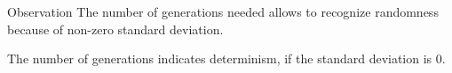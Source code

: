 \begin{frame}
\vspace*{2mm}
\begin{block}{
Observation
}
The number of generations needed allows to recognize randomness
because of non-zero standard deviation.
 
The number of generations indicates determinism,
if the standard deviation is $0$.
\end{block}
\end{frame}
